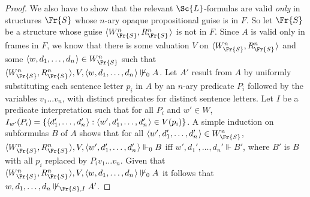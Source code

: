 \documentclass[11pt]{woarticle}
\theoremstyle{break}
\theoremstyle{nonumberplain}
\newcommand{\SAT}{\Vdash}
\newcommand{\1}{\;\,|\;\,}
\renewcommand{\t}[1]{\ensuremath{\langle #1  \makebox[.2ex]{}\rangle}}
\begin{document}
\begin{proof}
  We also have to show that the relevant $\Sc{L}$-formulas are valid \emph{only}
  in structures $\Fr{S}$ whose $n$-ary opaque propositional guise is in $F$. So
  let $\Fr{S}$ be a structure whose guise $\t{W^n_{\Fr{S}},R^n_{\Fr{S}}}$ is not
  in $F$. Since $A$ is valid only in frames in $F$, we know that there is some
  valuation $V$ on $\t{W^n_{\Fr{S}},R^n_{\Fr{S}}}$ and some
  $\t{w,d_1,\ldots,d_n} \in W^n_{\Fr{S}}$ such that
  $\t{W^n_{\Fr{S}},R^n_{\Fr{S}}},V,\t{w,d_1,\ldots,d_n} \not\SAT_0 A$. Let $A'$
  result from $A$ by uniformly substituting each sentence letter $p_i$ in $A$ by
  an $n$-ary predicate $P_i$ followed by the variables $v_1\ldots v_n$, with
  distinct predicates for distinct sentence letters. Let $I$ be a predicate
  interpretation such that for all $P_i$ and $w'\in W$,
  $I_{w'}(P_i) = \{ \t{d_1',\ldots,d_n'} : \t{w',d_1',\ldots,d_n'} \in V(p_i) \}$.
  A simple induction on subformulas $B$ of $A$ shows that for all
  $\t{w',d_1',\ldots,d_n'} \in W^n_{\Fr{S}}$,
  $\t{W^n_{\Fr{S}},R^n_{\Fr{S}}},V,\t{w',d_1',\ldots,d_n'} \SAT_0 B$ iff
  $w',d_1',\ldots,d_n' \SAT B'$, where $B'$ is $B$ with all $p_i$ replaced by
  $P_i v_1\ldots v_n$. Given that
  $\t{W^n_{\Fr{S}},R^n_{\Fr{S}}},V,\t{w,d_1,\ldots,d_n} \not\SAT_0 A$ it follows
  that $w,d_1,\ldots,d_n \not\SAT_{\Fr{S},I} A'$.
\end{proof}
\end{document}
